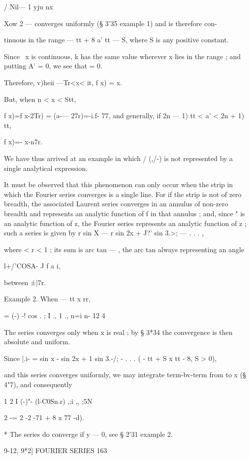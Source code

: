   / Nil— 1 yju nx 

Xow 2   —   converges uniformly (§ 3'35 example 1) and is therefore con- 

tinuous in the range — tt + 8   a'   tt — S, where S is any positive constant. 

Since \ x is continuous, k has the same value wherever x lies in the range ; and putting 
A' = 0, we see that   = 0. 

Therefore, v)heii —Tr<x< it, f x) =  x. 

But, when n < x < Stt, 

f x)=f x-2Tr) =   (a-— 27r)=-i.f- 77, 
and generally, if  2n — 1) tt < a' <  2n + 1) tt, 

f x)=- x-n7r. 

We have thus arrived at an example in which / (,/-) is not represented by a single 
analytical expression. 

It must be observed that this phenomenon can only occur when the strip in which the 
Fourier series converges is a single line. For if the strip is not of zero breadth, the 
associated Laurent series converges in an annulus of non-zero breadth and represents an 
analytic function of f in that annulus ; and, since  " is an analytic function of z, the Fourier 
series represents an analytic function of z ; such a series is given by 
r sin X —  r  sin 2x + J?'  sin 3.>; — . . . , 

where < r < 1 ; its sum is arc tan — , the arc tan always representing an angle 

l+/'COSA- J f a i, 

between ±|7r. 

Example 2. When — tt  x rr, 

=  (-) -! cos  . ; I ., 1 ., 
n=i n- 12 4 

The series converges only when x is real ; by § 3*34 the convergence is then absolute 
and uniform. 

Since |.i- = sin x -   sin 2x + 1 sin 3.-/; - . . . ( - tt + S   x   tt - 8, S > 0), 

and this series converges uniformly, we may integrate term-bv-term from to x (§ 4"7), 
and consequently 

1 2 I (-)"- (l-C0Sn.r) ,;i ,,  ;5N 

2 -= 2 -2  -71 + 8 x 77 -d). 

* The series do converge if y — 0, see § 2'31 example 2. 



9-12, 9*2] FOURIER SERIES 163 

